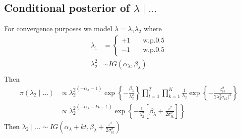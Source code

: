 \documentclass[useAMS,usenatbib,referee]{biomweb}
\begin{document}
\subsection*{Conditional posterior of $\lambda \mid \ldots$}\label{s:lambdapost}
For convergence purposes we model $\lambda = \lambda_1 \lambda_2$ where
\begin{align}
  \lambda_1 &= \left\{ \begin{array}{ll}
      +1 \quad & \text{w.p.} 0.5\\
      -1 \quad & \text{w.p.} 0.5
   \end{array}\right.\\
   \lambda^2_2 & \sim IG(\alpha_\lambda, \beta_\lambda).\\
\end{align}
Then
\begin{align*}
  \pi(\lambda_2 \mid \ldots) &\propto {\lambda_2^2}^{(-\alpha_\lambda - 1)} \exp\left\{ - \frac{ \beta_\lambda }{ \lambda_2^2} \right\} \prod_{t = 1}^{T} \prod_{k = 1}^K \frac{1} {\lambda_2} \exp\left\{ - \frac{ z^2_{tk} }{ 2 \lambda_2^2  \sigma_{tk})^2} \right\} \\
   & \propto {\lambda_2^2}^{(-\alpha_\lambda - kt - 1)} \exp \left\{ -\frac{1}{\lambda^2_2} \left[ \beta_\lambda + \frac{ z^2 }{2 \sigma^2_{tk}} \right] \right\}
\end{align*}
Then $\lambda_2 \mid \ldots \sim IG \left(\alpha_\lambda + kt, \beta_\lambda + \frac{ z^2 }{2 \sigma^2_{tk}} \right)$
\end{document}
